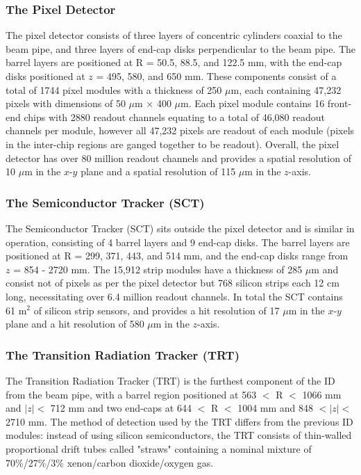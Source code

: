 \documentclass[12pt,a4paper,epsf,portrait,times,epsfig]{report}
\begin{document}
		\subsubsection{The Pixel Detector}\label{Section:PixelDetector}

		The pixel detector consists of three layers of concentric cylinders coaxial to the beam pipe, and three layers of end-cap disks perpendicular to the beam pipe. The barrel layers are positioned at R = 50.5, 88.5, and 122.5 mm, with the end-cap disks positioned at $z$ = 495, 580, and 650 mm. These components consist of a total of 1744 pixel modules \cite{ATLASPixel} with a thickness of 250 $\mu$m, each containing 47,232 pixels with dimensions of 50 $\mu$m $\times$ 400 $\mu$m. Each pixel module contains 16 front-end chips with 2880 readout channels equating to a total of 46,080 readout channels per module, however all 47,232 pixels are readout of each module (pixels in the inter-chip regions are ganged together to be readout). Overall, the pixel detector has over 80 million readout channels and provides a spatial resolution of 10 $\mu$m in the $x$-$y$ plane and a spatial resolution of 115 $\mu$m in the $z$-axis. 


		\subsubsection{The Semiconductor Tracker (SCT)}\label{Section:SCT}

		The Semiconductor Tracker (SCT) \cite{ATLASSCT} sits outside the pixel detector and is similar in operation, consisting of 4 barrel layers and 9 end-cap disks. The barrel layers are positioned at R = 299, 371, 443, and 514 mm, and the end-cap disks range from $z$ = 854 - 2720 mm. The 15,912 strip modules have a thickness of 285 $\mu$m and consist not of pixels as per the pixel detector but 768 silicon strips each 12 cm long, necessitating over 6.4 million readout channels. In total the SCT contains 61 m$^{2}$ of silicon strip sensors, and provides a hit resolution of 17 $\mu$m in the $x$-$y$ plane and a hit resolution of 580 $\mu$m in the $z$-axis. 

		\subsubsection{The Transition Radiation Tracker (TRT)}\label{Section:TRT} 

		The Transition Radiation Tracker (TRT) \cite{ATLASTRT} is the furthest component of the ID from the beam pipe, with a barrel region positioned at 563 $<$ R $<$ 1066 mm and $|z| <$ 712 mm and two end-caps at 644 $<$ R $<$ 1004 mm and 848 $< |z| <$ 2710 mm. The method of detection used by the TRT differs from the previous ID modules: instead of using silicon semiconductors, the TRT consists of thin-walled proportional drift tubes called "straws" containing a nominal mixture of 70\%/27\%/3\% xenon/carbon dioxide/oxygen gas. \par 
\end{document}
